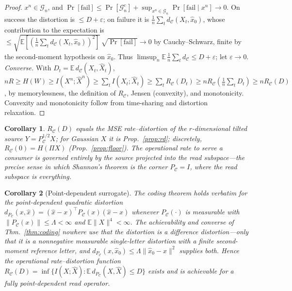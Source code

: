 \documentclass[11pt]{article}
\newtheorem{corollary}{Corollary}
\theoremstyle{definition}
\theoremstyle{remark}
\newcommand{\PC}{P_{\mathcal{C}}}
\newcommand{\E}{\mathbb{E}}
\begin{document}
\begin{proof}
$x^n\in\mathcal{G}_n$, and $\Pr[\mathrm{fail}]\le\Pr[\mathcal{G}_n^{c}]+
\sup_{x^n\in\mathcal{G}_n}\Pr[\mathrm{fail}\mid x^n]\to0$. On success the distortion is $\le D+\varepsilon$; on
failure it is $\tfrac1n\sum_t d_{\mathcal{C}}(X_t,\hat x_0)$, whose contribution to
the expectation is $\le\sqrt{\E[(\tfrac1n\sum_t d_{\mathcal{C}}(X_t,\hat x_0))^2]}\,
\sqrt{\Pr[\mathrm{fail}]}\to0$ by Cauchy--Schwarz, finite by the second-moment
hypothesis on $\hat x_0$. Thus $\limsup_n\E\,\tfrac1n\sum_t d_{\mathcal{C}}\le
D+\varepsilon$; let $\varepsilon\to0$.
\emph{Converse.} With $D_t=\E\,d_{\mathcal{C}}(X_t,\hat X_t)$,
$nR\ge H(W)\ge I(X^n;\hat X^n)\ge\sum_t I(X_t;\hat X_t)\ge\sum_t R_{\mathcal{C}}(D_t)
\ge nR_{\mathcal{C}}(\tfrac1n\sum_t D_t)\ge nR_{\mathcal{C}}(D)$, by memorylessness,
the definition of $R_{\mathcal{C}}$, Jensen (convexity), and monotonicity. Convexity
and monotonicity follow from time-sharing and distortion relaxation.
\end{proof}

\begin{corollary}\label{cor:coding}
$R_{\mathcal{C}}(D)$ equals the MSE rate--distortion of the $r$-dimensional tilted
source $Y=\PC^{1/2}X$; for Gaussian $X$ it is Prop.~\ref{prop:rd}; discretely,
$R_{\mathcal{C}}(0)=H(\Pi X)$ (Prop.~\ref{prop:floor}). The operational rate to serve
a consumer is governed entirely by the source projected into the read subspace---the
precise sense in which Shannon's theorem is the corner $\PC=I$, where the read
subspace is everything.
\end{corollary}

\begin{corollary}[Point-dependent surrogate]\label{cor:pointdep}
The coding theorem holds verbatim for the \emph{point-dependent} quadratic distortion
$d_{\PC}(x,\hat x)=(\hat x-x)^\top\PC(x)(\hat x-x)$ whenever $\PC(\cdot)$ is measurable
with $\|\PC(x)\|\le\Lambda<\infty$ and $\E\|X\|^4<\infty$. The achievability and
converse of Thm.~\ref{thm:coding} nowhere use that the distortion is a
\emph{difference} distortion---only that it is a nonnegative measurable single-letter
distortion with a finite second-moment reference letter, and $d_{\PC}(x,\hat x_0)\le
\Lambda\|\hat x_0-x\|^2$ supplies both. Hence the operational rate--distortion function
$R_{\mathcal{C}}(D)=\inf\{I(X;\hat X):\E\,d_{\PC}(X,\hat X)\le D\}$ exists and is
achievable for a fully point-dependent read operator.
\end{corollary}
\end{document}
